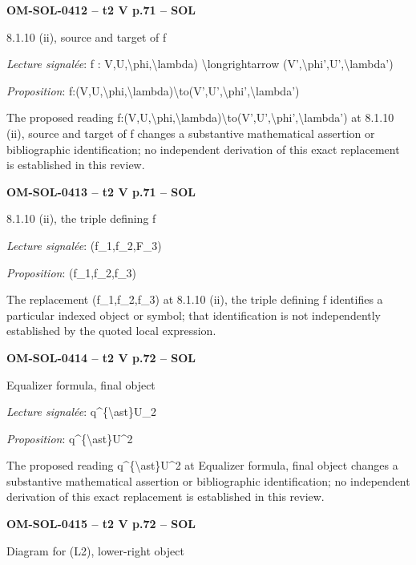 \par\noindent\textbf{OM-SOL-0412 -- t2 V p.71 -- SOL}\par
8.1.10 (ii), source and target of f\par
\emph{Lecture signalée}: f : V,U,\textbackslash{}phi,\textbackslash{}lambda) \textbackslash{}longrightarrow (V',\textbackslash{}phi',U',\textbackslash{}lambda')\par
\emph{Proposition}: f:(V,U,\textbackslash{}phi,\textbackslash{}lambda)\textbackslash{}to(V',U',\textbackslash{}phi',\textbackslash{}lambda')\par
The proposed reading f:(V,U,\textbackslash{}phi,\textbackslash{}lambda)\textbackslash{}to(V',U',\textbackslash{}phi',\textbackslash{}lambda') at 8.1.10 (ii), source and target of f changes a substantive mathematical assertion or bibliographic identification; no independent derivation of this exact replacement is established in this review.\par
\par\noindent\textbf{OM-SOL-0413 -- t2 V p.71 -- SOL}\par
8.1.10 (ii), the triple defining f\par
\emph{Lecture signalée}: (f\_1,f\_2,F\_3)\par
\emph{Proposition}: (f\_1,f\_2,f\_3)\par
The replacement (f\_1,f\_2,f\_3) at 8.1.10 (ii), the triple defining f identifies a particular indexed object or symbol; that identification is not independently established by the quoted local expression.\par
\par\noindent\textbf{OM-SOL-0414 -- t2 V p.72 -- SOL}\par
Equalizer formula, final object\par
\emph{Lecture signalée}: q\textasciicircum{}\{\textbackslash{}ast\}U\_2\par
\emph{Proposition}: q\textasciicircum{}\{\textbackslash{}ast\}U\textasciicircum{}2\par
The proposed reading q\textasciicircum{}\{\textbackslash{}ast\}U\textasciicircum{}2 at Equalizer formula, final object changes a substantive mathematical assertion or bibliographic identification; no independent derivation of this exact replacement is established in this review.\par
\par\noindent\textbf{OM-SOL-0415 -- t2 V p.72 -- SOL}\par
Diagram for (L2), lower-right object\par
